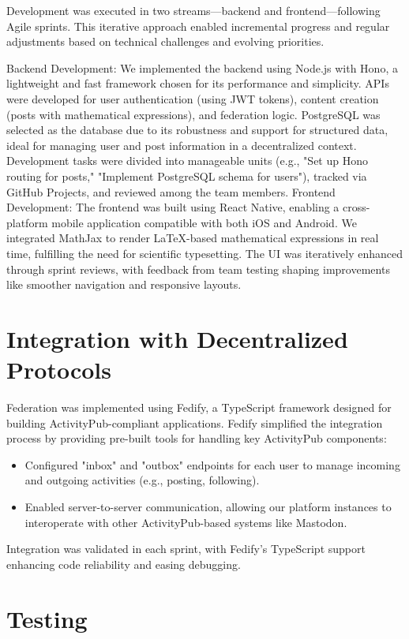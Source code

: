 Development was executed in two streams—backend and frontend—following Agile sprints. This iterative approach enabled incremental progress and regular adjustments based on technical challenges and evolving priorities.

    Backend Development: We implemented the backend using Node.js with Hono, a lightweight and fast framework chosen for its performance and simplicity. APIs were developed for user authentication (using JWT tokens), content creation (posts with mathematical expressions), and federation logic. PostgreSQL was selected as the database due to its robustness and support for structured data, ideal for managing user and post information in a decentralized context. Development tasks were divided into manageable units (e.g., "Set up Hono routing for posts," "Implement PostgreSQL schema for users"), tracked via GitHub Projects, and reviewed among the team members.
    Frontend Development: The frontend was built using React Native, enabling a cross-platform mobile application compatible with both iOS and Android. We integrated MathJax to render LaTeX-based mathematical expressions in real time, fulfilling the need for scientific typesetting. The UI was iteratively enhanced through sprint reviews, with feedback from team testing shaping improvements like smoother navigation and responsive layouts.


\section{Integration with Decentralized Protocols}

Federation was implemented using Fedify, a TypeScript framework designed for building ActivityPub-compliant applications. Fedify simplified the integration process by providing pre-built tools for handling key ActivityPub components:
\begin{itemize}
  \item{Configured "inbox" and "outbox" endpoints for each user to manage incoming and outgoing activities (e.g., posting, following).}
\item{Enabled server-to-server communication, allowing our platform instances to interoperate with other ActivityPub-based systems like Mastodon.}
  \end{itemize}
Integration was validated in each sprint, with Fedify’s TypeScript support enhancing code reliability and easing debugging.

\section{Testing}

